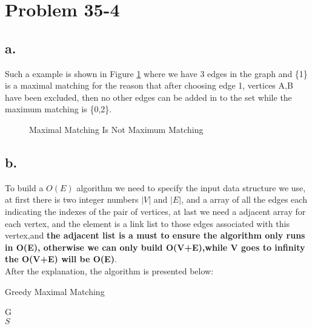 \documentclass[oneside]{homework} %
\begin{document}
\maketitle
\newpage
\section {Problem 35-4}
\subsection*{a.}
Such a example is shown in Figure \ref{fig:3541} where we have 3 edges in the graph and \{1\} is a maximal matching for the reason that after choosing edge 1, vertices A,B have been excluded, then no other edges can be added in to the set while the maximum matching is \{0,2\}. 
\begin{figure}[!h]
  \centering
  \caption{Maximal Matching Is Not Maximum Matching}
  \label{fig:3541}
\end{figure}

\subsection*{b.}
To build a $O(E)$ algorithm we need to specify the input data structure we use, at first there is two integer numbers $|V|$ and $|E|$, and a array of all the edges each indicating the indexes of the pair of vertices, at last we need a adjacent array for each vertex, and the element is a link list to those edges associated with this vertex,and \textbf{the adjacent list is a must to ensure the algorithm only runs in O(E), otherwise we can only build O(V+E),while V goes to infinity the O(V+E) will be O(E)}.  \\
After the explanation, the algorithm is presented below:\\

\begin{algorithm}[h]
\caption{Greedy Maximal Matching}
\label{algo:SJF}
\begin{algorithmic}[1]
  \REQUIRE G
  \ENSURE ~ ~\\ 
  \ENDFOR
		\ENDIF
	  \ENDFOR
		\ENDIF
	  \ENDFOR
	\ENDIF
  \ENDFOR
	\ENDIF
  \ENDFOR
  \LASTCON $S$
\end{algorithmic}
\end{algorithm}
\end{document}
